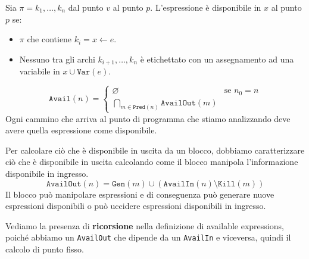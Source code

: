 Sia $\pi = k_1, \dots, k_n$ dal punto $v$ al punto $p$. L'espressione è disponibile in $x$ al
punto $p$ se:
\begin{itemize}
    \item $\pi$ che contiene $k_i = x \gets e$.
    \item Nessuno tra gli archi $k_{i + 1}, \dots, k_n$ è etichettato con un 
    assegnamento ad una variabile in $x \cup \texttt{Var}(e)$.
\end{itemize}
\begin{equation}
    \texttt{Avail}(n) =
    \begin{cases}
        \varnothing & \text{se } n_0 = n\\
        \bigcap_{m \in \texttt{Pred}(n)} \texttt{AvailOut}(m)
    \end{cases}
\end{equation}
Ogni cammino che arriva al punto di programma che stiamo analizzando deve avere quella espressione come disponibile.
\begin{figure}[H]
    \centering
\end{figure}

Per calcolare ciò che è disponibile in uscita da un blocco, dobbiamo caratterizzare ciò che è disponibile
in uscita calcolando come il blocco manipola l'informazione disponibile in ingresso.
\begin{equation}
    \texttt{AvailOut}(n) = \texttt{Gen}(m) \cup (\texttt{AvailIn}(n) \setminus \texttt{Kill}(m))
\end{equation}
Il blocco può manipolare espressioni e di conseguenza può generare nuove espressioni disponibili 
o può uccidere espressioni disponibili in ingresso.

Vediamo la presenza di \textbf{ricorsione} nella definizione di available expressions, poiché abbiamo 
un \texttt{AvailOut} che dipende da un \texttt{AvailIn} e viceversa, quindi il calcolo di punto fisso.

